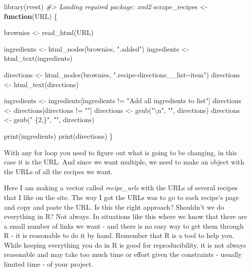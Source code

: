 \documentclass[
  12pt,
]{book}
\newenvironment{Shaded}{\begin{snugshade}}{\end{snugshade}}
\newcommand{\CommentTok}[1]{\textcolor[rgb]{0.37,0.37,0.37}{\textit{#1}}}
\newcommand{\ControlFlowTok}[1]{\textcolor[rgb]{0.27,0.27,0.27}{\textbf{#1}}}
\newcommand{\FunctionTok}[1]{\textcolor[rgb]{0,0,0}{#1}}
\newcommand{\NormalTok}[1]{#1}
\newcommand{\OtherTok}[1]{\textcolor[rgb]{0.37,0.37,0.37}{#1}}
\newcommand{\SpecialCharTok}[1]{\textcolor[rgb]{0,0,0}{#1}}
\newcommand{\StringTok}[1]{\textcolor[rgb]{0.5,0.5,0.5}{#1}}
\begin{document}
\begin{Shaded}
\begin{Highlighting}[]
\FunctionTok{library}\NormalTok{(rvest)}
\CommentTok{\#\textgreater{} Loading required package: xml2}
\NormalTok{scrape\_recipes }\OtherTok{\textless{}{-}} \ControlFlowTok{function}\NormalTok{(URL) \{}
  
\NormalTok{  brownies }\OtherTok{\textless{}{-}} \FunctionTok{read\_html}\NormalTok{(URL)}
  
\NormalTok{  ingredients }\OtherTok{\textless{}{-}} \FunctionTok{html\_nodes}\NormalTok{(brownies, }\StringTok{".added"}\NormalTok{)}
\NormalTok{  ingredients }\OtherTok{\textless{}{-}} \FunctionTok{html\_text}\NormalTok{(ingredients)}
  
\NormalTok{  directions }\OtherTok{\textless{}{-}} \FunctionTok{html\_nodes}\NormalTok{(brownies, }\StringTok{".recipe{-}directions\_\_list{-}{-}item"}\NormalTok{)}
\NormalTok{  directions }\OtherTok{\textless{}{-}} \FunctionTok{html\_text}\NormalTok{(directions)}
  
\NormalTok{  ingredients }\OtherTok{\textless{}{-}}\NormalTok{ ingredients[ingredients }\SpecialCharTok{!=} \StringTok{"Add all ingredients to list"}\NormalTok{]}
\NormalTok{  directions  }\OtherTok{\textless{}{-}}\NormalTok{ directions[directions }\SpecialCharTok{!=} \StringTok{""}\NormalTok{]}
\NormalTok{  directions  }\OtherTok{\textless{}{-}} \FunctionTok{gsub}\NormalTok{(}\StringTok{"}\SpecialCharTok{\textbackslash{}n}\StringTok{"}\NormalTok{, }\StringTok{""}\NormalTok{, directions)}
\NormalTok{  directions  }\OtherTok{\textless{}{-}} \FunctionTok{gsub}\NormalTok{(}\StringTok{" \{2,\}"}\NormalTok{, }\StringTok{""}\NormalTok{, directions)}
  
  \FunctionTok{print}\NormalTok{(ingredients)}
  \FunctionTok{print}\NormalTok{(directions)}
\NormalTok{\}}
\end{Highlighting}
\end{Shaded}

With any for loop you need to figure out what is going to be changing, in this case it is the URL. And since we want multiple, we need to make an object with the URLs of all the recipes we want.

Here I am making a vector called \emph{recipe\_urls} with the URLs of several recipes that I like on the site. The way I got the URLs was to go to each recipe's page and copy and paste the URL. Is this the right approach? Shouldn't we do everything in R? Not always. In situations like this where we know that there are a small number of links we want - and there is no easy way to get them through R - it is reasonable to do it by hand. Remember that R is a tool to help you. While keeping everything you do in R is good for reproducibility, it is not always reasonable and may take too much time or effort given the constraints - usually limited time - of your project.
\end{document}
